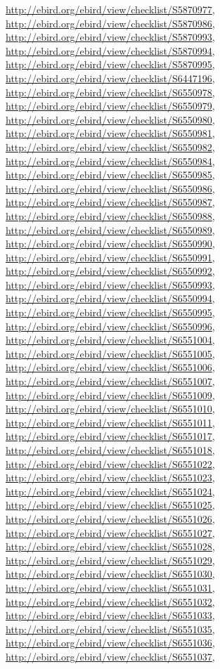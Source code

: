 \documentclass[9pt, article]{memoir}
\begin{document}
\begin{multicols}{2}
\url{http://ebird.org/ebird/view/checklist/S5870977}, 
\url{http://ebird.org/ebird/view/checklist/S5870986}, 
\url{http://ebird.org/ebird/view/checklist/S5870993}, 
\url{http://ebird.org/ebird/view/checklist/S5870994}, 
\url{http://ebird.org/ebird/view/checklist/S5870995}, 
\url{http://ebird.org/ebird/view/checklist/S6447196}, 
\url{http://ebird.org/ebird/view/checklist/S6550978}, 
\url{http://ebird.org/ebird/view/checklist/S6550979}, 
\url{http://ebird.org/ebird/view/checklist/S6550980}, 
\url{http://ebird.org/ebird/view/checklist/S6550981}, 
\url{http://ebird.org/ebird/view/checklist/S6550982}, 
\url{http://ebird.org/ebird/view/checklist/S6550984}, 
\url{http://ebird.org/ebird/view/checklist/S6550985}, 
\url{http://ebird.org/ebird/view/checklist/S6550986}, 
\url{http://ebird.org/ebird/view/checklist/S6550987}, 
\url{http://ebird.org/ebird/view/checklist/S6550988}, 
\url{http://ebird.org/ebird/view/checklist/S6550989}, 
\url{http://ebird.org/ebird/view/checklist/S6550990}, 
\url{http://ebird.org/ebird/view/checklist/S6550991}, 
\url{http://ebird.org/ebird/view/checklist/S6550992}, 
\url{http://ebird.org/ebird/view/checklist/S6550993}, 
\url{http://ebird.org/ebird/view/checklist/S6550994}, 
\url{http://ebird.org/ebird/view/checklist/S6550995}, 
\url{http://ebird.org/ebird/view/checklist/S6550996}, 
\url{http://ebird.org/ebird/view/checklist/S6551004}, 
\url{http://ebird.org/ebird/view/checklist/S6551005}, 
\url{http://ebird.org/ebird/view/checklist/S6551006}, 
\url{http://ebird.org/ebird/view/checklist/S6551007}, 
\url{http://ebird.org/ebird/view/checklist/S6551009}, 
\url{http://ebird.org/ebird/view/checklist/S6551010}, 
\url{http://ebird.org/ebird/view/checklist/S6551011}, 
\url{http://ebird.org/ebird/view/checklist/S6551017}, 
\url{http://ebird.org/ebird/view/checklist/S6551018}, 
\url{http://ebird.org/ebird/view/checklist/S6551022}, 
\url{http://ebird.org/ebird/view/checklist/S6551023}, 
\url{http://ebird.org/ebird/view/checklist/S6551024}, 
\url{http://ebird.org/ebird/view/checklist/S6551025}, 
\url{http://ebird.org/ebird/view/checklist/S6551026}, 
\url{http://ebird.org/ebird/view/checklist/S6551027}, 
\url{http://ebird.org/ebird/view/checklist/S6551028}, 
\url{http://ebird.org/ebird/view/checklist/S6551029}, 
\url{http://ebird.org/ebird/view/checklist/S6551030}, 
\url{http://ebird.org/ebird/view/checklist/S6551031}, 
\url{http://ebird.org/ebird/view/checklist/S6551032}, 
\url{http://ebird.org/ebird/view/checklist/S6551033}, 
\url{http://ebird.org/ebird/view/checklist/S6551035}, 
\url{http://ebird.org/ebird/view/checklist/S6551036}, 
\url{http://ebird.org/ebird/view/checklist/S6551037}, 

\end{multicols}
\end{document}
